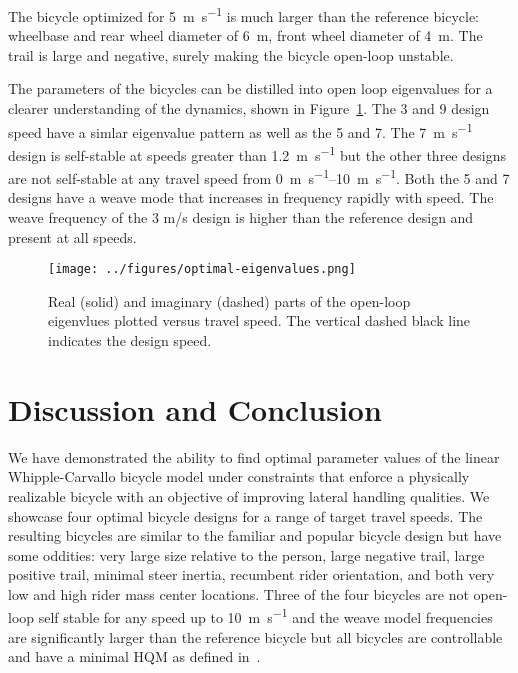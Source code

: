 \documentclass{bmd2019a}
\begin{document}
The bicycle optimized for 5~\si{\meter\per\second} is much larger than the
reference bicycle: wheelbase and rear wheel diameter of 6~\si{\meter}, front
wheel diameter of 4~\si{\meter}. The trail is large and negative, surely making
the bicycle open-loop unstable.

The parameters of the bicycles can be distilled into open loop eigenvalues for
a clearer understanding of the dynamics, shown in
Figure~\ref{fig:optimal-eigenvalues}. The 3 and 9 design speed have a simlar
eigenvalue pattern as well as the 5 and 7. The 7~\si{\meter\per\second} design
is self-stable at speeds greater than 1.2~\si{\meter\per\second} but the other
three designs are not self-stable at any travel speed from
\SIrange{0}{10}{\meter\per\second}. Both the 5 and 7 designs have a weave mode
that increases in frequency rapidly with speed. The weave frequency of the 3
m/s design is higher than the reference design and present at all speeds.
%
\begin{figure}
  \centering
  \texttt{[image: ../figures/optimal-eigenvalues.png]}
  \label{fig:optimal-eigenvalues}
  \caption{Real (solid) and imaginary (dashed) parts of the open-loop eigenvlues plotted versus
    travel speed. The vertical dashed black line indicates the design speed.}
\end{figure}

\section{Discussion and Conclusion}
%
We have demonstrated the ability to find optimal parameter values of the linear
Whipple-Carvallo bicycle model under constraints that enforce a physically
realizable bicycle with an objective of improving lateral handling qualities.
We showcase four optimal bicycle designs for a range of target travel speeds.
The resulting bicycles are similar to the familiar and popular bicycle design
but have some oddities: very large size relative to the person, large negative
trail, large positive trail, minimal steer inertia, recumbent rider
orientation, and both very low and high rider mass center locations. Three of
the four bicycles are not open-loop self stable for any speed up to
10~\si{\meter\per\second} and the weave model frequencies are significantly
larger than the reference bicycle but all bicycles are controllable and have a
minimal HQM as defined in~\cite{Hess2012}.
\end{document}
